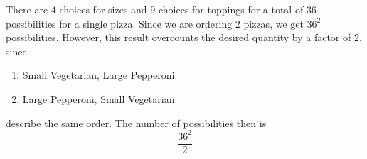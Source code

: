 There are $4$ choices for sizes and $9$ choices for toppings for a total of $36$ possibilities for a single pizza. Since we are ordering $2$ pizzas, we get $36^{2}$ possibilities. However, this result overcounts the desired quantity by a factor of $2$, since

\begin{enumerate}
\item Small Vegetarian, Large Pepperoni

\item Large Pepperoni, Small Vegetarian
\end{enumerate}

describe the same order. The number of possibilities then is $$\frac{36^{2}}{2}$$
